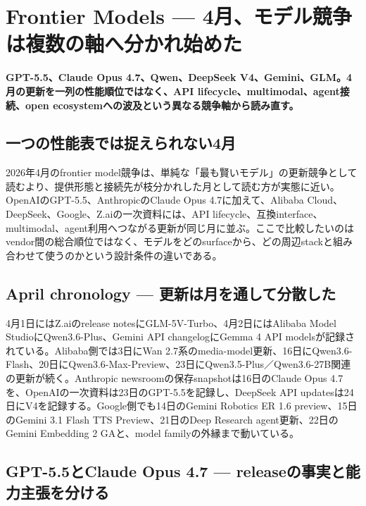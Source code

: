\section{Frontier Models — 4月、モデル競争は複数の軸へ分かれ始めた}
\noindent\textbf{GPT-5.5、Claude Opus 4.7、Qwen、DeepSeek V4、Gemini、GLM。4月の更新を一列の性能順位ではなく、API lifecycle、multimodal、agent接続、open ecosystemへの波及という異なる競争軸から読み直す。}\autocite{src-9156c37fb1c2,src-a24fd97eb3d0,src-dfe7e0c6ff39,src-e547d0d8cbe3,src-eac8dfbeb78c,src-f6aa679babd7}

\subsection{一つの性能表では捉えられない4月}

2026年4月のfrontier model競争は、単純な「最も賢いモデル」の更新競争として読むより、提供形態と接続先が枝分かれした月として読む方が実態に近い。OpenAIのGPT-5.5、AnthropicのClaude Opus 4.7に加えて、Alibaba Cloud、DeepSeek、Google、Z.aiの一次資料には、API lifecycle、互換interface、multimodal、agent利用へつながる更新が同じ月に並ぶ。ここで比較したいのはvendor間の総合順位ではなく、モデルをどのsurfaceから、どの周辺stackと組み合わせて使うのかという設計条件の違いである。\autocite{src-9156c37fb1c2,src-a24fd97eb3d0,src-dfe7e0c6ff39,src-e547d0d8cbe3,src-eac8dfbeb78c,src-f6aa679babd7}


\subsection{April chronology — 更新は月を通して分散した}

4月1日にはZ.aiのrelease notesにGLM-5V-Turbo、4月2日にはAlibaba Model StudioにQwen3.6-Plus、Gemini API changelogにGemma 4 API modelsが記録されている。Alibaba側では3日にWan 2.7系のmedia-model更新、16日にQwen3.6-Flash、20日にQwen3.6-Max-Preview、23日にQwen3.5-Plus／Qwen3.6-27B関連の更新が続く。Anthropic newsroomの保存snapshotは16日のClaude Opus 4.7を、OpenAIの一次資料は23日のGPT-5.5を記録し、DeepSeek API updatesは24日にV4を記録する。Google側でも14日のGemini Robotics ER 1.6 preview、15日のGemini 3.1 Flash TTS Preview、21日のDeep Research agent更新、22日のGemini Embedding 2 GAと、model familyの外縁まで動いている。\autocite{src-9156c37fb1c2,src-a24fd97eb3d0,src-dfe7e0c6ff39,src-e547d0d8cbe3,src-eac8dfbeb78c,src-f6aa679babd7}


\subsection{GPT-5.5とClaude Opus 4.7 — releaseの事実と能力主張を分ける}

